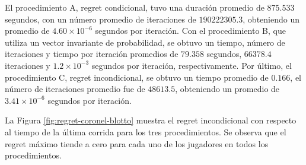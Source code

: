  El procedimiento A, regret condicional, tuvo una duración promedio de $875.533$ segundos, con un número promedio de iteraciones de $190222305.3$, obteniendo un promedio de $4.60 {\times} 10^{-6}$ segundos por iteración. Con el procedimiento B, que utiliza un vector invariante de probabilidad, se obtuvo un tiempo, número de iteraciones y tiempo por iteración promedios de $79.358$ segundos, $66378.4$ iteraciones y $1.2 {\times} 10^{-3}$ segundos por iteración, respectivamente. Por último, el procedimiento C, regret incondicional, se obtuvo un tiempo promedio de $0.166$, el número de iteraciones promedio fue de $48613.5$, obteniendo un promedio de $3.41 {\times} 10^{-6}$ segundos por iteración.
 
 
 La Figura \ref{fig:regret-coronel-blotto} muestra el regret incondicional con respecto al tiempo de la última corrida para los tres procedimientos. Se observa que el regret máximo tiende a cero para cada uno de los jugadores en todos los procedimientos.
 